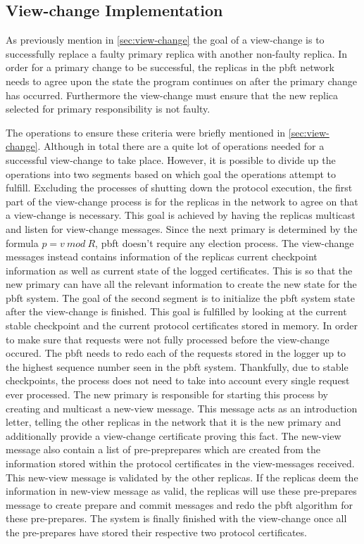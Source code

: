\subsection{View-change Implementation}
As previously mention in \autoref{sec:view-change} the goal of a view-change is to successfully replace a faulty primary replica with another non-faulty replica. In order for a primary change to be successful, the replicas in the \ac{pbft} network needs to agree upon the state the program continues on after the primary change has occurred. Furthermore the view-change must ensure that the new replica selected for primary responsibility is not faulty. 

The operations to ensure these criteria were briefly mentioned in \autoref{sec:view-change}. Although in total there are a quite lot of operations needed for a successful view-change to take place. However, it is possible to divide up the operations into two segments based on which goal the operations attempt to fulfill. Excluding the processes of shutting down the protocol execution, the first part of the view-change process is for the replicas in the network to agree on that a view-change is necessary. This goal is achieved by having the replicas multicast and listen for view-change messages. Since the next primary is determined by the formula $p = v ~mod~ R$, \ac{pbft} doesn't require any election process. The view-change messages instead contains information of the replicas current checkpoint information as well as current state of the logged certificates. This is so that the new primary can have all the relevant information to create the new state for the \ac{pbft} system. The goal of the second segment is to initialize the \ac{pbft} system state after the view-change is finished. This goal is fulfilled by looking at the current stable checkpoint and the current protocol certificates stored in memory. In order to make sure that requests were not fully processed before the view-change occured. The \ac{pbft} needs to redo each of the requests stored in the logger up to the highest sequence number seen in the \ac{pbft} system. Thankfully, due to stable checkpoints, the process does not need to take into account every single request ever processed. The new primary is responsible for starting this process by creating and multicast a new-view message. This message acts as an introduction letter, telling the other replicas in the network that it is the new primary and additionally provide a view-change certificate proving this fact. The new-view message also contain a list of pre-preprepares which are created from the information stored within the protocol certificates in the view-messages received. This new-view message is validated by the other replicas. If the replicas deem the information in new-view message as valid, the replicas will use these pre-prepares message to create prepare and commit messages and redo the \ac{pbft} algorithm for these pre-prepares. The system is finally finished with the view-change once all the pre-prepares have stored their respective two protocol certificates. 

